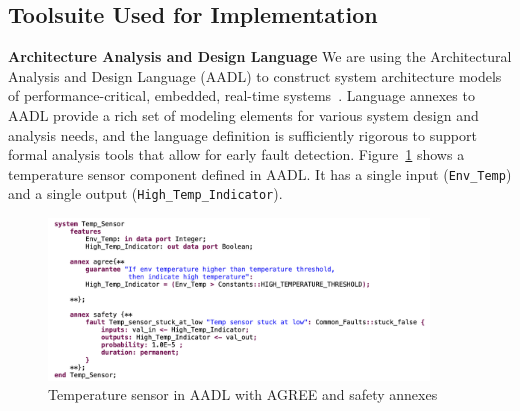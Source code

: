 \subsection{Toolsuite Used for Implementation}

\textbf{Architecture Analysis and Design Language}
We are using the Architectural Analysis and Design Language (AADL) to construct system architecture models of performance-critical, embedded, real-time systems~\cite{AADL_Standard}. %
Language annexes to AADL provide a rich set of modeling elements for various system design and analysis needs, and the language definition is sufficiently rigorous to support formal analysis tools that allow for early fault detection. Figure~\ref{fig:tempSensor} shows a temperature sensor component defined in AADL. It has a single input (\texttt{Env\_Temp}) and a single output (\texttt{High\_Temp\_Indicator}).  

\begin{figure}[h!]
	\vspace{-2em}
	\begin{center}
		\includegraphics[width=0.9\textwidth]{images/tempSensoraadlannex.png}
	\end{center}
	\vspace{-2em}
	\caption{Temperature sensor in AADL with AGREE and safety annexes}
	\label{fig:tempSensor}
	\vspace{-2em}
\end{figure}

